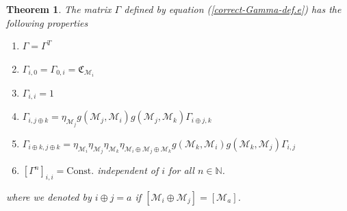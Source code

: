 \documentclass[12font]{article}
\newtheorem{theorem}{Theorem}[section]
\theoremstyle{definition}
\numberwithin{equation}{section}
\newcommand{\mrm}[1]{\mathrm{#1}}
\begin{document}
\begin{theorem}
  The matrix $\Gamma$ defined by equation (\ref{correct-Gamma-def.e}) has the following properties
  \begin{enumerate}
    \item $\Gamma = \Gamma^T$ 
    \item $\Gamma_{i,0} = \Gamma_{0,i} = \mathfrak{C}_{\mathcal{M}_i}$
    \item $\Gamma_{i,i} = 1$
    \item $
        \Gamma_{i,j\oplus k} = \eta_{\mathcal{M}_j} g(\mathcal{M}_j,\mathcal{M}_i)g(\mathcal{M}_j,\mathcal{M}_k) \Gamma_{i\oplus j,k}
        $
    \item   $
            \Gamma_{i\oplus k,j\oplus k} = 
            \eta_{\mathcal{M}_i}
            \eta_{\mathcal{M}_j}
            \eta_{\mathcal{M}_k} \eta_{\mathcal{M}_i\oplus\mathcal{M}_j\oplus\mathcal{M}_k} g(\mathcal{M}_k,\mathcal{M}_i) g(\mathcal{M}_k,\mathcal{M}_j)
            \Gamma_{i,j}
            $
    \item   $[\Gamma^n]_{i,i} = \mrm{Const.}$ independent of $i$ for all $n\in\mathbb{N}$.
  \end{enumerate}
  where we denoted by $i\oplus j=a$ if $[\mathcal{M}_i\oplus\mathcal{M}_j] = [\mathcal{M}_a]$.
\end{theorem}
\end{document}
